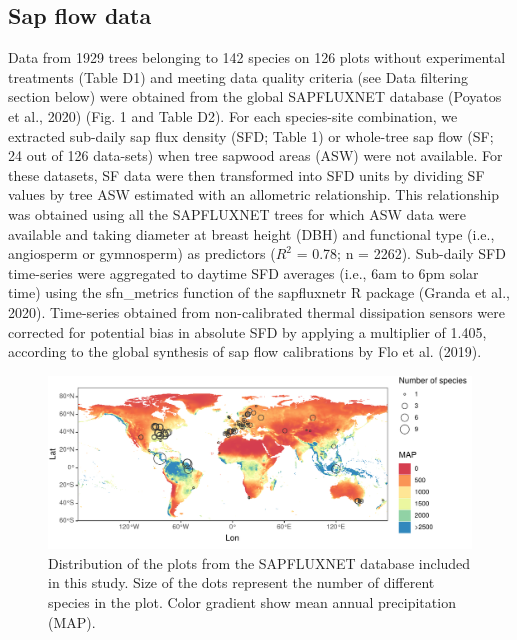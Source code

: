 \documentclass[11pt,twoside]{reedthesis}
\begin{document}
\subsection{Sap flow data}\label{sap-flow-data}

Data from 1929 trees belonging to 142 species on 126 plots without
experimental treatments (Table D1) and meeting data quality criteria
(see Data filtering section below) were obtained from the global
SAPFLUXNET database (Poyatos et al., 2020) (Fig. 1 and Table D2). For
each species-site combination, we extracted sub-daily sap flux density
(SFD; Table 1) or whole-tree sap flow (SF; 24 out of 126 data-sets) when
tree sapwood areas (ASW) were not available. For these datasets, SF data
were then transformed into SFD units by dividing SF values by tree ASW
estimated with an allometric relationship. This relationship was
obtained using all the SAPFLUXNET trees for which ASW data were
available and taking diameter at breast height (DBH) and functional type
(i.e., angiosperm or gymnosperm) as predictors (\(R^2\) = 0.78; n =
2262). Sub-daily SFD time-series were aggregated to daytime SFD averages
(i.e., 6am to 6pm solar time) using the sfn\_metrics function of the
sapfluxnetr R package (Granda et al., 2020). Time-series obtained from
non-calibrated thermal dissipation sensors were corrected for potential
bias in absolute SFD by applying a multiplier of 1.405, according to the
global synthesis of sap flow calibrations by Flo et al. (2019).\par
\begin{figure}[hbt!]

{\centering \includegraphics[width=1\linewidth]{figure/CH5/Figure_1} 

}

\caption[Distribution of the plots from the SAPFLUXNET database included in this study.]{Distribution of the plots from the SAPFLUXNET database included in this study. Size of the dots represent the number of different species in the plot. Color gradient show mean annual precipitation (MAP).}\label{fig:ch5fig1}
\end{figure}
\end{document}
